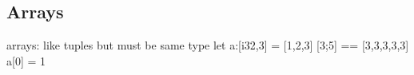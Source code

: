 
\subsection{Arrays}


arrays: like tuples but must be same type
let a:[i32,3] = [1,2,3]
[3;5] == [3,3,3,3,3]
a[0] = 1